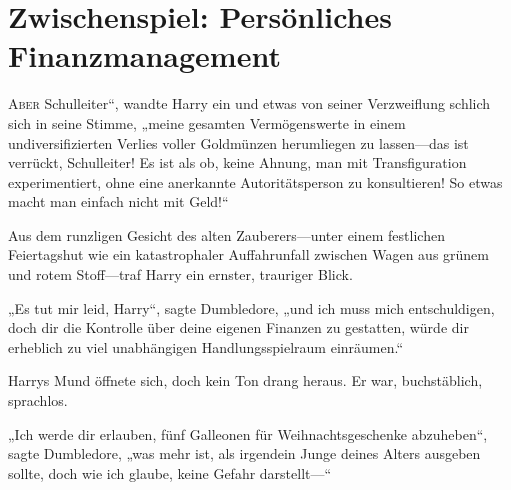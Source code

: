 \chapter{Zwischenspiel: Persönliches Finanzmanagement}

\lettrine[ante=„]{A}{ber} Schulleiter“, wandte Harry ein und etwas von seiner Verzweiflung schlich sich in seine Stimme, „meine gesamten Vermögenswerte in einem undiversifizierten Verlies voller Goldmünzen herumliegen zu lassen—das ist verrückt, Schulleiter! Es ist als ob, keine Ahnung, man mit Transfiguration experimentiert, ohne eine anerkannte Autoritätsperson zu konsultieren! So etwas macht man einfach nicht mit Geld!“

Aus dem runzligen Gesicht des alten Zauberers—unter einem festlichen Feiertagshut wie ein katastrophaler Auffahrunfall zwischen Wagen aus grünem und rotem Stoff—traf Harry ein ernster, trauriger Blick.

„Es tut mir leid, Harry“, sagte Dumbledore, „und ich muss mich entschuldigen, doch dir die Kontrolle über deine eigenen Finanzen zu gestatten, würde dir erheblich zu viel unabhängigen Handlungsspielraum einräumen.“

Harrys Mund öffnete sich, doch kein Ton drang heraus. Er war, buchstäblich, sprachlos.

„Ich werde dir erlauben, fünf Galleonen für Weihnachtsgeschenke abzuheben“, sagte Dumbledore, „was mehr ist, als irgendein Junge deines Alters ausgeben sollte, doch wie ich glaube, keine Gefahr darstellt—“

